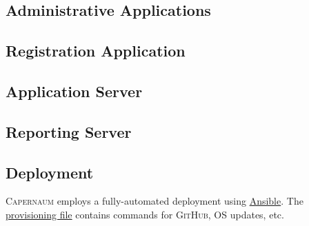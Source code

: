 \documentclass{article}
\newcommand{\ghsrc}[2]{\href{https://github.com/quantum-bits/capernaum/blob/development/#1}{#2}}
\newcommand{\caper}{\textsc{Capernaum}}
\newcommand{\gh}{\textsc{GitHub}}
\begin{document}
\subsection{Administrative Applications}
\label{sec:admin-applications}

\subsection{Registration Application}
\label{sec:group-application}

\subsection{Application Server}
\label{sec:application-server}

\subsection{Reporting Server}
\label{sec:reporting-server}

\subsection{Deployment}
\label{sec:deployment}

\caper{} employs a fully-automated deployment
using \href{https://www.ansible.com/}{Ansible}.
The \ghsrc{ansible/provision.yaml}{provisioning file} contains commands for \gh{}, OS updates, etc.
\end{document}
